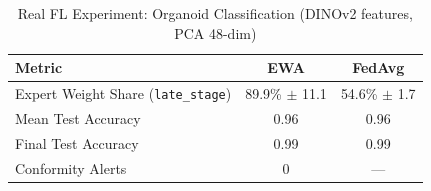 \begin{table}[h]
\centering
\caption{Real FL Experiment: Organoid Classification (DINOv2 features, PCA 48-dim)}
\label{tab:organoid_real}
\begin{tabular}{lcc}
\toprule
Metric & EWA & FedAvg \\
\midrule
Expert Weight Share (\texttt{late\_stage}) & 89.9\% $\pm$ 11.1 & 54.6\% $\pm$ 1.7 \\
Mean Test Accuracy & 0.96 & 0.96 \\
Final Test Accuracy & 0.99 & 0.99 \\
Conformity Alerts & 0 & — \\
\bottomrule
\end{tabular}
\end{table}
